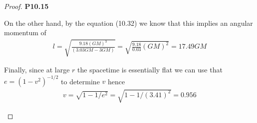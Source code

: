 \documentclass[11pt]{article}
\theoremstyle{definition}
\begin{document}
\begin{proof}{\textbf{P10.15}}
\begin{itemize}
    On the other hand, by the equation (10.32) we know that this implies an
    angular momentum of
    \begin{align*}
        l = \sqrt{\frac{9.18(GM)^3}{(3.03GM - 3GM)}}
        = \sqrt{\frac{9.18}{0.03}(GM)^2}
        = 17.49GM
    \end{align*}

    Finally, since at large $r$ the spacetime is essentially flat we can use
    that $e = (1 - v^2)^{-1/2}$ to determine $v$ hence
    \begin{align*} 
        v = \sqrt{1 - 1/e^2} = \sqrt{1 - 1/(3.41)^2} = 0.956
    \end{align*}
\end{itemize}
\end{proof}
\end{document}
